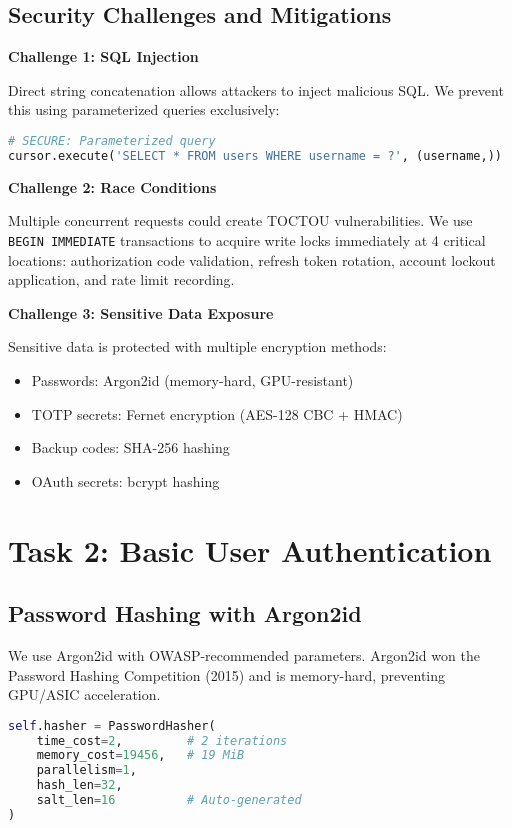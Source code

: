 \documentclass[12pt,a4paper]{article}
\begin{document}
\subsection{Security Challenges and Mitigations}

\textbf{Challenge 1: SQL Injection}

Direct string concatenation allows attackers to inject malicious SQL. We prevent this using parameterized queries exclusively:

\begin{lstlisting}[language=Python]
# SECURE: Parameterized query
cursor.execute('SELECT * FROM users WHERE username = ?', (username,))
\end{lstlisting}

\textbf{Challenge 2: Race Conditions}

Multiple concurrent requests could create TOCTOU vulnerabilities. We use \texttt{BEGIN IMMEDIATE} transactions to acquire write locks immediately at 4 critical locations: authorization code validation, refresh token rotation, account lockout application, and rate limit recording.

\textbf{Challenge 3: Sensitive Data Exposure}

Sensitive data is protected with multiple encryption methods:
\begin{itemize}
    \item Passwords: Argon2id (memory-hard, GPU-resistant)
    \item TOTP secrets: Fernet encryption (AES-128 CBC + HMAC)
    \item Backup codes: SHA-256 hashing
    \item OAuth secrets: bcrypt hashing
\end{itemize}

\section{Task 2: Basic User Authentication}

\subsection{Password Hashing with Argon2id}

We use Argon2id with OWASP-recommended parameters. Argon2id won the Password Hashing Competition (2015) and is memory-hard, preventing GPU/ASIC acceleration.

\begin{lstlisting}[language=Python]
self.hasher = PasswordHasher(
    time_cost=2,         # 2 iterations
    memory_cost=19456,   # 19 MiB
    parallelism=1,
    hash_len=32,
    salt_len=16          # Auto-generated
)
\end{lstlisting}
\end{document}
